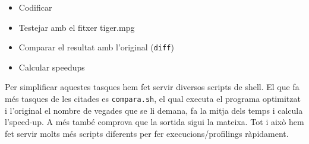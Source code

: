 \begin{itemize}
  \item Codificar
  \item Testejar amb el fitxer tiger.mpg
  \item Comparar el resultat amb l'original (\texttt{diff})
  \item Calcular speedups
\end{itemize}

Per simplificar aquestes tasques hem fet servir diversos scripts de shell. El que fa més tasques de les citades es \texttt{compara.sh}, el qual executa el programa optimitzat i l'original el nombre de vegades que se li demana, fa la mitja dels temps i calcula l'speed-up. A més també comprova que la sortida sigui la mateixa. Tot i això hem fet servir molts més scripts diferents per fer execucions/profilings ràpidament.
